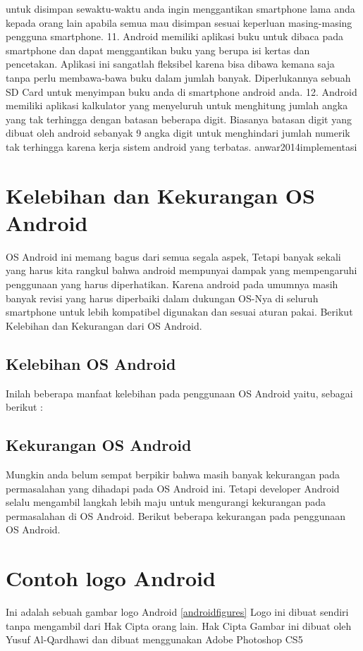 \begin{figures}
			untuk disimpan sewaktu-waktu anda ingin menggantikan smartphone lama anda kepada orang lain apabila semua mau disimpan sesuai keperluan masing-masing pengguna smartphone.
		11.	Android memiliki aplikasi buku untuk dibaca pada smartphone dan dapat menggantikan buku yang berupa isi kertas dan pencetakan. Aplikasi ini sangatlah fleksibel karena bisa dibawa kemana saja tanpa perlu membawa-bawa
			buku dalam jumlah banyak. Diperlukannya sebuah SD Card untuk menyimpan buku anda di smartphone android anda.
		12.	Android memiliki aplikasi kalkulator yang menyeluruh untuk menghitung jumlah angka yang tak terhingga dengan batasan beberapa digit. Biasanya batasan digit yang dibuat oleh android sebanyak 9 angka digit
			untuk menghindari jumlah numerik tak terhingga karena kerja sistem android yang terbatas.
	anwar2014implementasi
	\section{Kelebihan dan Kekurangan OS Android}
		OS Android ini memang bagus dari semua segala aspek, Tetapi banyak sekali yang harus kita rangkul bahwa android mempunyai dampak yang mempengaruhi penggunaan yang harus diperhatikan. Karena android pada umumnya masih banyak revisi
		yang harus diperbaiki dalam dukungan OS-Nya di seluruh smartphone untuk lebih kompatibel digunakan dan sesuai aturan pakai. Berikut Kelebihan dan Kekurangan dari OS Android.
	
	\subsection{Kelebihan OS Android}
		Inilah beberapa manfaat kelebihan pada penggunaan OS Android yaitu, sebagai berikut :
		\cite{hamka2013aplikasi}
		
	\subsection{Kekurangan OS Android}
		Mungkin anda belum sempat berpikir bahwa masih banyak kekurangan pada permasalahan yang dihadapi pada OS Android ini. Tetapi developer Android selalu mengambil langkah lebih maju untuk mengurangi
		kekurangan pada permasalahan di OS Android. Berikut beberapa kekurangan pada penggunaan OS Android.
		\cite{hamka2013aplikasi}
	
	\section{Contoh logo Android}
		Ini adalah sebuah gambar logo Android \ref{androidfigures}
		Logo ini dibuat sendiri tanpa mengambil dari Hak Cipta orang lain.
		Hak Cipta Gambar ini dibuat oleh Yusuf Al-Qardhawi dan dibuat menggunakan Adobe Photoshop CS5
		

\end{figures}
